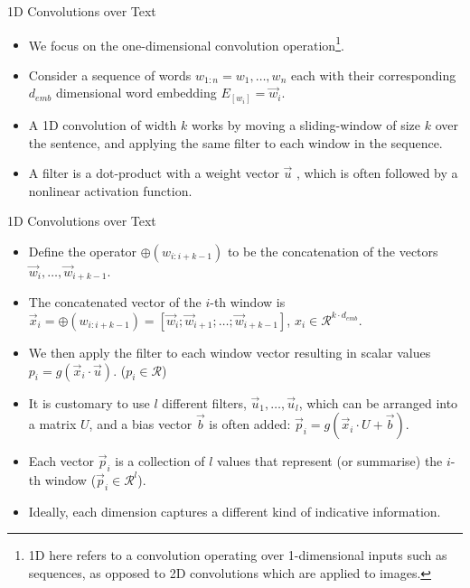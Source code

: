 \documentclass[handout]{beamer}
\begin{document}
\begin{frame}{1D Convolutions over Text}
\begin{scriptsize}
\begin{itemize}
\item We focus on the one-dimensional convolution operation\footnote{1D here refers to a convolution operating over 1-dimensional inputs such as sequences, as opposed to 2D convolutions which
are applied to images.}.
\item Consider a sequence of words $w_{1:n}=w_1 ,\dots,w_n$ each with their corresponding $d_{emb}$ dimensional word embedding $E_{[w_i]}=\vec{w}_{i}$.
\item A 1D convolution of width $k$ works by moving a sliding-window of size $k$ over the sentence, and applying the same filter to each window
in the sequence.
\item A filter is a dot-product with a weight vector $\vec{u}$ , which is often followed by a nonlinear activation function.
\end{itemize}
\end{scriptsize}
\end{frame}

\begin{frame}{1D Convolutions over Text}
\begin{scriptsize}
\begin{itemize}
\item Define the operator $\oplus (w_{i:i+k-1})$ to be the concatenation of the vectors $\vec{w}_{i}, \dots, \vec{w}_{i+k-1}$.
\item The concatenated vector of the $i$-th window is $\vec{x}_{i}=\oplus (w_{i:i+k-1}) = [\vec{w}_{i};\vec{w}_{i+1};\dots;\vec{w}_{i+k-1}]$, $x_{i} \in \mathcal{R}^{k \cdot d_{emb}}$.
\item We then apply the filter to each window vector resulting in scalar values $p_{i} =  g(\vec{x}_{i} \cdot \vec{u})$. ($p_{i} \in \mathcal{R}$)
\item It is customary to use $l$ different filters, $\vec{u}_1,\dots, \vec{u}_l$, which can be arranged into a matrix $U$, and a bias vector $\vec{b}$ is often added: $\vec{p}_{i}=g(\vec{x}_{i}\cdot U +\vec{b})$.

\item Each vector $\vec{p}_i$ is a collection of $l$ values that represent (or summarise) the $i$-th window ($\vec{p}_{i} \in \mathcal{R}^l$). 
\item Ideally, each dimension captures a different kind of indicative information.

\end{itemize}
\end{scriptsize}
\end{frame}
\end{document}
